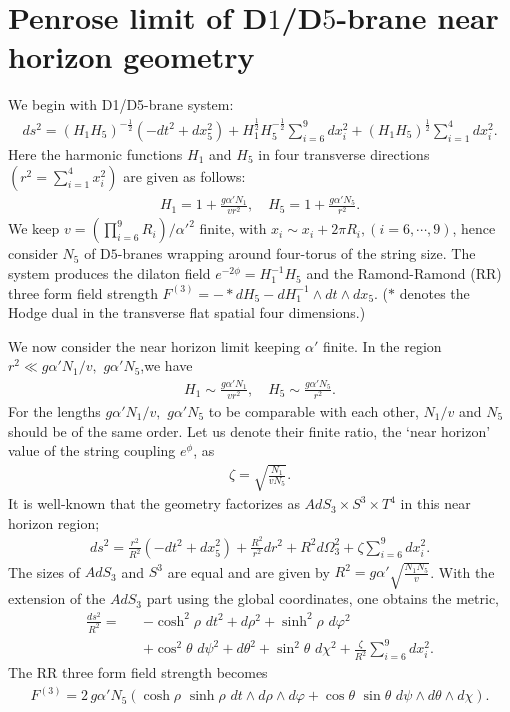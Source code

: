 \documentclass[a4paper,12pt]{article}
\begin{document}
\section{Penrose limit of D$1$/D$5$-brane near horizon geometry}\label{ii}


We begin with D1/D5-brane system:
\begin{eqnarray}\label{d1/d5}
ds^2=(H_1H_5)^{-\frac{1}{2}}\left(-dt^2+dx_5^2\right)+H_1^{\frac{1}{2}}H_5^{-\frac{1}{2}}\sum\limits_{i=6}^{9}dx_i^2+(H_1H_5)^{\frac{1}{2}}\sum\limits_{i=1}^{4}dx_i^2.
\end{eqnarray}
Here the harmonic functions $H_1$ and $H_5$ in four transverse directions $(r^2=\sum\limits_{i=1}^{4}x_i^2)$ are given as follows:
\begin{eqnarray}
H_1=1+\frac{g\alpha'N_1}{vr^2},\quad H_5=1+\frac{g\alpha'N_5}{r^2}.
\end{eqnarray}
We keep $v=(\prod\limits_{i=6}^{9}R_i)/\alpha'^{2}$ finite, with $x_i\sim x_i+2\pi R_i, (i=6,\cdots, 9)$, hence consider  $N_5$ of D$5$-branes wrapping around four-torus of the string size. The system produces the dilaton field $e^{-2\phi}=H_1^{-1}H_5$ and the Ramond-Ramond (RR) three form field strength $F^{(3)}=-\ast dH_5-dH_1^{-1}\wedge dt\wedge dx_5$. ($\ast$ denotes the Hodge dual in the transverse flat spatial four dimensions.)
 

We now consider the near horizon limit keeping $\alpha'$ finite.
In the region $r^2\ll g\alpha'N_1/v,\,\,g\alpha'N_5$,we have
\begin{eqnarray}
H_1\sim\frac{g\alpha'N_1}{vr^2},\quad H_5\sim\frac{g\alpha'N_5}{r^2}.
\end{eqnarray}
For the lengths $g\alpha'N_1/v,\,\,g\alpha'N_5$ to be comparable with each other, $N_1/v$ and $N_5$ should be of the same order. Let us denote their finite ratio, the `near horizon' value of the string coupling $e^\phi$, as
\begin{eqnarray}
\zeta=\sqrt{\frac{N_1}{vN_5}}. 
\end{eqnarray}
It is well-known that the geometry factorizes as $AdS_3\times S^3\times T^4$ in this near horizon region;
\begin{eqnarray}
ds^2=\frac{r^2}{R^2}\left(-dt^2+dx_5^2\right)+\frac{R^2}{r^2}dr^2+R^2d\Omega_3^2+\zeta\sum\limits_{i=6}^{9}dx_i^2.
\end{eqnarray}
The sizes of $AdS_3$ and $S^3$ are equal and are given by $R^2=g\alpha'\sqrt{\frac{N_1N_5}{v}}$.
With the extension of the $AdS_3$ part using the global coordinates, one obtains the metric,
\begin{eqnarray}\label{adsmetric}
\frac{ds^2}{R^2}=&&-\cosh^2\rho\,\, dt^2+d\rho^2+\sinh^2\rho \,\,d\varphi^2\nonumber\\
&&+\cos^2{\theta}\,\,d\psi^2+d\theta^2+\sin^2{\theta}\,\,d\chi^2+\frac{\zeta}{R^2}\sum\limits_{i=6}^{9}dx_i^2.
\end{eqnarray}
The RR three form field strength becomes
\begin{eqnarray}
F^{(3)}=2\,g\alpha'N_5\left(\cosh{\rho}\,\,\sinh{\rho}\,\,dt\wedge d\rho\wedge d\varphi+\cos{\theta}\,\,\sin{\theta}\,\,d\psi\wedge d\theta\wedge d\chi\right).
\end{eqnarray}
\end{document}
